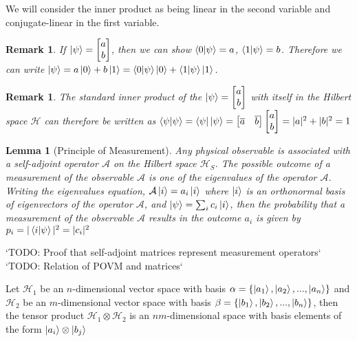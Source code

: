 \documentclass[12pt,twoside]{report}
\newtheorem{lemma}[subsection]{Lemma}
\newtheorem{remark}[subsection]{Remark}
\begin{document}
We will consider the inner product as being linear in the second variable and conjugate-linear in the first variable.

\begin{remark}
If $\ket{\psi} = \begin{bmatrix} a \\ b \end{bmatrix}$, then we can show $\braket{0|\psi} = a$, $\braket{1|\psi} = b$.
Therefore we can write $\ket{\psi} = a \ket{0} + b \ket{1} = \braket{0|\psi} \ket{0} + \braket{1|\psi} \ket{1}$.
\end{remark}

\begin{remark}
The standard inner product of the $\ket{\psi} = \begin{bmatrix} a \\ b \end{bmatrix}$ with itself in the Hilbert space $\mathcal{H}$ can therefore be written as $\braket{\psi | \psi} = \bra{\psi}\ket{\psi} = \begin{bmatrix} \overline{a} & \overline{b}\end{bmatrix} \begin{bmatrix} a \\ b \end{bmatrix} = |a|^2 + |b|^2 = 1$
\end{remark}

\begin{lemma}[Principle of Measurement]
Any physical observable is associated with a self-adjoint operator $\mathcal{A}$ on the Hilbert space $\mathcal{H}_S$. The possible outcome of a measurement of the observable $\mathcal{A}$ is one of the eigenvalues of the operator $\mathcal{A}$. \\
Writing the eigenvalues equation, $\mathcal{A} \ket{i} = a_i \ket{i}$ where $\ket{i}$ is an orthonormal basis of eigenvectors of the operator $\mathcal{A}$, and  $\ket{\psi} = \sum_i c_i \ket{i}$,  then the probability that a measurement of the observable $\mathcal{A}$ results in the outcome $a_i$ is given by $p_i = |\braket{i|\psi}|^2 = |c_i|^2$
\end{lemma}

`TODO: Proof that self-adjoint matrices represent measurement operators`
`TODO: Relation of POVM and matrices`

Let $\mathcal{H}_1$ be an $n$-dimensional vector space with basis $\alpha = \{ \ket{a_1}, \ket{a_2}, ..., \ket{a_n} \}$ and $\mathcal{H}_2$ be an $m$-dimensional vector space with basis $\beta = \{ \ket{b_1}, \ket{b_2}, ..., \ket{b_n} \}$, then the tensor product $\mathcal{H}_1 \otimes \mathcal{H}_2$ is an $nm$-dimensional space with basis elements of the form $\ket{a_i} \otimes \ket{b_j}$
\end{document}

